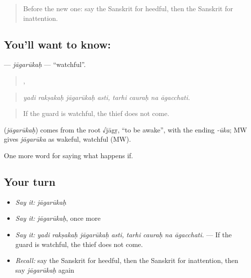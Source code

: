 \label{lesson:SA-C539-jagarukah}



\begin{quote}
Before the new one: say the Sanskrit for heedful, then the Sanskrit for inattention.
\end{quote}

\subsection*{You'll want to know: }
\textbf{} — \emph{jāgarūkaḥ} — \textquotedblleft{}watchful\textquotedblright{}.

\begin{quote}
   ,    
\end{quote}

\begin{quote}
\emph{yadi rakṣakaḥ jāgarūkaḥ asti, tarhi cauraḥ na āgacchati.}
\end{quote}

\begin{quote}
If the guard is watchful, the thief does not come.
\end{quote}

\begin{cousinweb}
\textbf{} (\emph{jāgarūkaḥ}) comes from the root √jāgṛ, \textquotedblleft{}to be awake\textquotedblright{}, with the ending \emph{-ūka}; MW gives \emph{jāgarūka} as wakeful, watchful (MW).
\end{cousinweb}

\begin{grammarlens}[title={What you've built}]
One more word for saying what happens if.
\end{grammarlens}

\subsection*{Your turn}
\begin{itemize}
\raggedright
  \item \emph{Say it:} \emph{jāgarūkaḥ}
  \item \emph{Say it:} \emph{jāgarūkaḥ}, once more
  \item \emph{Say it:} \emph{yadi rakṣakaḥ jāgarūkaḥ asti, tarhi cauraḥ na āgacchati.} — If the guard is watchful, the thief does not come.
  \item \emph{Recall:} say the Sanskrit for heedful, then the Sanskrit for inattention, then say \emph{jāgarūkaḥ} again
\end{itemize}

